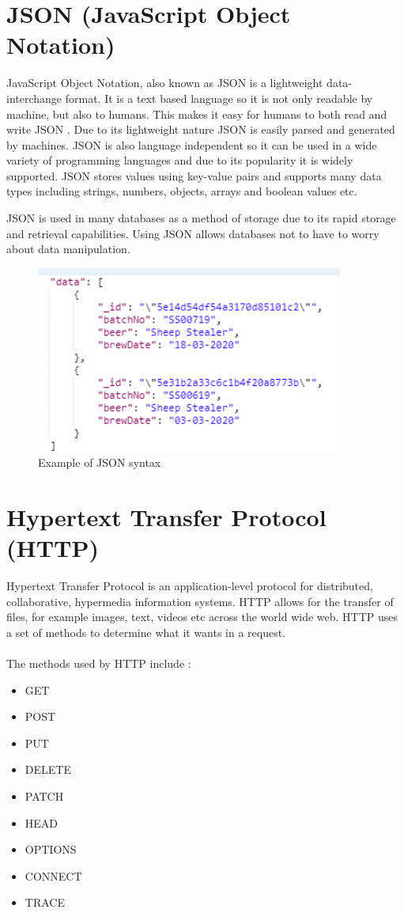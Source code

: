 \section{JSON (JavaScript Object Notation)}
JavaScript Object Notation, also known as JSON is a lightweight data-interchange format. It is a text based language so it is not only readable by machine, but also to humans. This makes it easy for humans to both read and write JSON \cite{nurseitov2009comparison}. Due to its lightweight nature JSON is easily parsed and generated by machines. JSON is also language independent so it can be used in a wide variety of programming languages and due to its popularity it is widely supported. JSON stores values using key-value pairs and supports many data types including strings, numbers, objects, arrays and boolean values etc.\par
JSON is used in many databases as a method of storage due to its rapid storage and retrieval capabilities. Using JSON allows databases not to have to worry about data manipulation. 
\begin{figure}[h!]
 	\caption{Example of JSON syntax}
	\label{image:JSON}
 	\centering
 	\includegraphics[width=0.9\textwidth]{Images/json example.PNG}
\end{figure}
\newpage

\section{Hypertext Transfer Protocol (HTTP)}
 Hypertext Transfer Protocol is an application-level protocol for distributed, collaborative, hypermedia information systems. HTTP allows for the transfer of files, for example images, text, videos etc across the world wide web. HTTP uses a set of methods to determine what it wants in a request. \\ \\
The methods used by HTTP include \cite{fielding1999hypertext}:
\begin{itemize}
    \item GET
    \item POST
    \item PUT
    \item DELETE
    \item PATCH
    \item HEAD
    \item OPTIONS
    \item CONNECT
    \item TRACE
\end{itemize}

